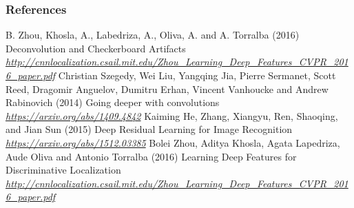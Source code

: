 \begin{vbframe}
\frametitle{References}
\footnotesize{
\begin{thebibliography}{99}

 B. Zhou, Khosla, A., Labedriza, A., Oliva, A. and A. Torralba (2016)
\newblock Deconvolution and Checkerboard Artifacts
\newblock \emph{\url{http://cnnlocalization.csail.mit.edu/Zhou_Learning_Deep_Features_CVPR_2016_paper.pdf}}
 Christian Szegedy, Wei Liu, Yangqing Jia, Pierre Sermanet, Scott Reed, Dragomir Anguelov, Dumitru Erhan, Vincent Vanhoucke and Andrew Rabinovich (2014)
\newblock Going deeper with convolutions
\newblock \emph{\url{https://arxiv.org/abs/1409.4842}}
 Kaiming He, Zhang, Xiangyu, Ren, Shaoqing, and Jian Sun (2015)
\newblock Deep Residual Learning for Image Recognition
\newblock \emph{\url{https://arxiv.org/abs/1512.03385}}
 Bolei Zhou, Aditya Khosla, Agata Lapedriza, Aude Oliva and Antonio Torralba (2016)
\newblock Learning Deep Features for Discriminative Localization
\newblock \emph{\url{http://cnnlocalization.csail.mit.edu/Zhou_Learning_Deep_Features_CVPR_2016_paper.pdf}}



\end{thebibliography}
}
\end{vbframe}
\endlecture

